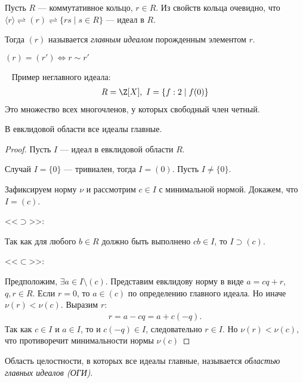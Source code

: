 \begin{defn}
    Пусть $R$ --- коммутативное кольцо, $r \in R$.
    Из свойств кольца очевидно, что $\langle r \rangle \rightleftharpoons  (r) \rightleftharpoons \{ rs \mid s \in R \}$ --- идеал в $R$.

    Тогда $(r)$ называется \emph{главным идеалом} порожденным элементом $r$.
\end{defn}

\begin{notice}
    $(r) = (r') \iff r \sim r'$
\end{notice}

\begin{example}~
    Пример неглавного идеала:
    \begin{gather*}
        R = \Z[X],~I = \{ f : 2 \mid f(0) \}
    \end{gather*}
    Это множество всех многочленов, у которых свободный член четный.
\end{example}

\begin{theorem-non}
    В евклидовой области все идеалы главные.
\end{theorem-non}

\begin{proof}
    Пусть $I$ --- идеал в евклидовой области $R$.

    Случай $I = \{0\}$ --- тривиален, тогда $I = (0)$. Пусть $I \neq \{0\}$.

    Зафиксируем норму $\nu$ и рассмотрим $c \in I$ с минимальной нормой. Докажем, что $I = (c)$.

    <<$\supset$>>:
    
    Так как для любого $b \in R$ должно быть выполнено $cb \in I$, то $I \supset (c)$.
    
    <<$\subset$>>:

    Предположим, $\exists a \in I \setminus (c)$. Представим евклидову норму в виде $a = cq + r$, $q, r \in R$.
    Если $r = 0$, то $a \in (c)$ по определению главного идеала. Но иначе $\nu(r) < \nu(c)$.
    Выразим $r$:
    \begin{gather*}
        r = a - cq = a + c(-q).
    \end{gather*} 
    Так как $c \in I$ и $a \in I$, то и $c(-q) \in I$, следовательно $r \in I$.
    Но $\nu(r) < \nu(c)$, что противоречит минимальности нормы $\nu(c)$
\end{proof}

\begin{defn}   
    Область целостности, в которых все идеалы главные, называется \emph{областью главных идеалов (ОГИ)}.
\end{defn}

